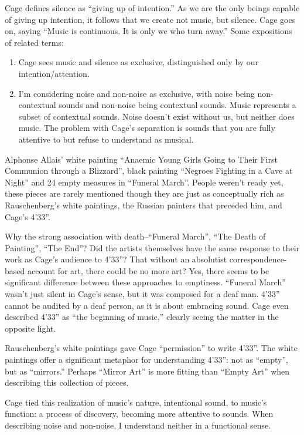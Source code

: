 \documentclass{thesis}
\begin{document}
	Cage defines silence as ``giving up of intention.'' As we are the only beings capable of giving up intention, it follows that we create not music, but silence. Cage goes on, saying ``Music is continuous. It is only we who turn away.'' Some expositions of related terms:
		
\begin{enumerate}
	\item Cage sees music and silence as exclusive, distinguished only by our intention/attention.
	\item I'm considering noise and non-noise as exclusive, with noise being non-contextual sounds and non-noise being contextual sounds. Music represents a subset of contextual sounds. Noise doesn't exist without us, but neither does music. The problem with Cage's separation is sounds that you are fully attentive to but refuse to understand as musical.
\end{enumerate}

	Alphonse Allais' white painting ``Anaemic Young Girls Going to Their First Communion through a Blizzard'', black painting ``Negroes Fighting in a Cave at Night'' and 24 empty measures in ``Funeral March''. People weren't ready yet, these pieces are rarely mentioned though they are just as conceptually rich as Rauschenberg's white paintings, the Russian painters that preceded him, and Cage's 4'33''.
	
	Why the strong association with death--``Funeral March'', ``The Death of Painting'', ``The End''? Did the artists themselves have the same response to their work as Cage's audience to 4'33''? That without an absolutist correspondence-based account for art, there could be no more art? Yes, there seems to be significant difference between these approaches to emptiness. ``Funeral March'' wasn't just silent in Cage's sense, but it was composed for a deaf man. 4'33'' cannot be audited by a deaf person, as it is about embracing sound. Cage even described 4'33'' as ``the beginning of music,'' clearly seeing the matter in the opposite light.
	
	Rauschenberg's white paintings gave Cage ``permission'' to write 4'33''. The white paintings offer a significant metaphor for understanding 4'33'': not as ``empty'', but as ``mirrors.'' Perhaps ``Mirror Art'' is more fitting than ``Empty Art'' when describing this collection of pieces.
	
	Cage tied this realization of music's nature, intentional sound, to music's function: a process of discovery, becoming more attentive to sounds. When describing noise and non-noise, I understand neither in a functional sense.
\end{document}
